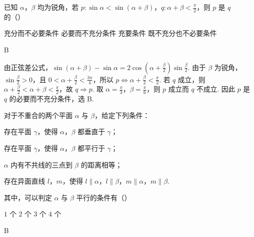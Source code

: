 \begin{problem}
已知 \(\alpha\)，\(\beta\) 均为锐角，若 \(p: \sin \alpha < \sin (\alpha + \beta)\)，\(q: \alpha + \beta < \frac{\pi}{2}\)，则 \(p\) 是 \(q\) 的（\quad）

\choices
    {充分而不必要条件}
    {必要而不充分条件}
    {充要条件}
    {既不充分也不必要条件}
\end{problem}

\begin{answer}
B
\end{answer}

\begin{solution}
由正弦差公式，\(\sin(\alpha+\beta)-\sin\alpha=2\cos\left(\alpha+\frac{\beta}{2}\right)\sin\frac{\beta}{2}\).
由于 \(\beta\) 为锐角，\(\sin\frac{\beta}{2}>0\)，且 \(0<\alpha+\frac{\beta}{2}<\frac{3\pi}{4}\)，所以
\(p\Longleftrightarrow \alpha+\frac{\beta}{2}<\frac{\pi}{2}\).
若 \(q\) 成立，则 \(\alpha+\frac{\beta}{2}<\alpha+\beta<\frac{\pi}{2}\)，故 \(q\Rightarrow p\). 取 \(\alpha=\frac{\pi}{3}\)，\(\beta=\frac{\pi}{6}\)，则 \(p\) 成立而 \(q\) 不成立. 因此 \(p\) 是 \(q\) 的必要而不充分条件，选 B.
\end{solution}

\begin{problem}
对于不重合的两个平面 \(\alpha\) 与 \(\beta\)，给定下列条件：

\begin{circlelist}
\item 存在平面 \(\gamma\)，使得 \(\alpha\)，\(\beta\) 都垂直于 \(\gamma\)；
\item 存在平面 \(\gamma\)，使得 \(\alpha\)，\(\beta\) 都平行于 \(\gamma\)；
\item \(\alpha\) 内有不共线的三点到 \(\beta\) 的距离相等；
\item 存在异面直线 \(l\)，\(m\)，使得 \(l \parallel \alpha\)，\(l \parallel \beta\)，\(m \parallel \alpha\)，\(m \parallel \beta\).
\end{circlelist}

其中，可以判定 \(\alpha\) 与 \(\beta\) 平行的条件有（\quad）

\choices
    {\(1\) 个}
    {\(2\) 个}
    {\(3\) 个}
    {\(4\) 个}
\end{problem}

\begin{answer}
B
\end{answer}

